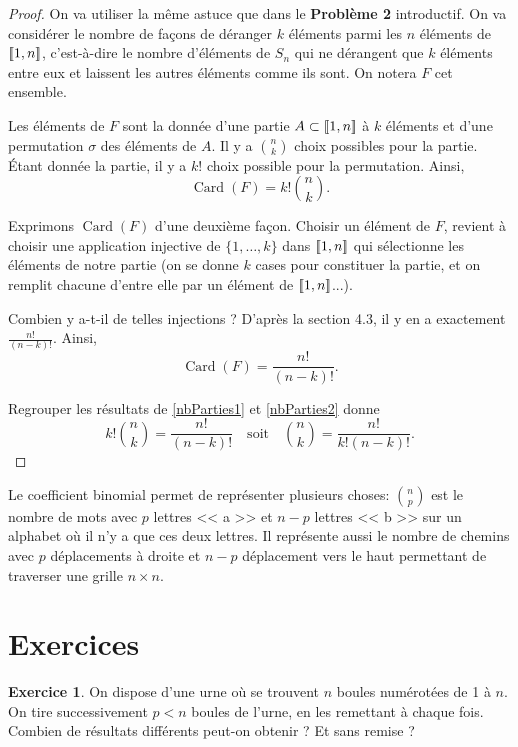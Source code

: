 \documentclass[twoside,11pt]{article}
\DeclareMathOperator{\Card}{\mathrm{Card}}
\DeclarePairedDelimiter{\zint}{[\![}{]\!]}
\theoremstyle{definition}
\newtheorem{exo}{Exercice}
\theoremstyle{remark}
\theoremstyle{theorem}
\begin{document}
\begin{proof}
On va utiliser la même astuce que dans le \textbf{Problème 2} introductif. On va considérer le nombre de façons de déranger $k$ éléments parmi les $n$ éléments de $\zint{1,n}$, c'est-à-dire le nombre d'éléments de $S_n$ qui ne dérangent que $k$ éléments entre eux et laissent les autres éléments comme ils sont. On notera $F$ cet ensemble.

Les éléments de $F$ sont la donnée d'une partie $A\subset \zint{1,n}$ à $k$ éléments et d'une permutation $\sigma$ des éléments de $A$. Il y a $\binom{n}{k}$ choix possibles pour la partie. Étant donnée la partie, il y a $k!$ choix possible pour la permutation. Ainsi,
\begin{equation}\label{nbParties1}
\Card(F) = k!\binom{n}{k}.
\end{equation}

Exprimons $\Card(F)$ d'une deuxième façon. Choisir un élément de $F$, revient à choisir une application injective de $\{1,\ldots,k\}$ dans $\zint{1,n}$ qui sélectionne les éléments de notre partie (on se donne $k$ cases pour constituer la partie, et on remplit chacune d'entre elle par un élément de $\zint{1,n}$...). 

Combien y a-t-il de telles injections ? D'après la section 4.3, il y en a exactement $\frac{n!}{(n-k)!}$. Ainsi,
\begin{equation}\label{nbParties2}
\Card(F) = \frac{n!}{(n-k)!}.
\end{equation}

Regrouper les résultats de \eqref{nbParties1} et \eqref{nbParties2} donne
\[
k!\binom{n}{k} = \frac{n!}{(n-k)!}\quad \text{soit}\quad \boxed{\binom{n}{k} = \frac{n!}{k!(n-k)!}.}
\]
\end{proof}

Le coefficient binomial permet de représenter plusieurs choses: $\displaystyle \binom{n}{p}$ est le nombre de mots avec $p$ lettres << a >> et $n-p$ lettres << b >> sur un alphabet où il n'y a que ces deux lettres. Il représente aussi le nombre de chemins avec $p$ déplacements à droite et $n-p$ déplacement vers le haut permettant de traverser une grille $n\times n$.

\section{Exercices}

\begin{exo}
	On dispose d'une urne où se trouvent $n$ boules numérotées de 1 à $n$. On tire successivement $p<n$ boules de l'urne, en les remettant à chaque fois. Combien de résultats différents peut-on obtenir ? Et sans remise ?
\end{exo}
\end{document}
